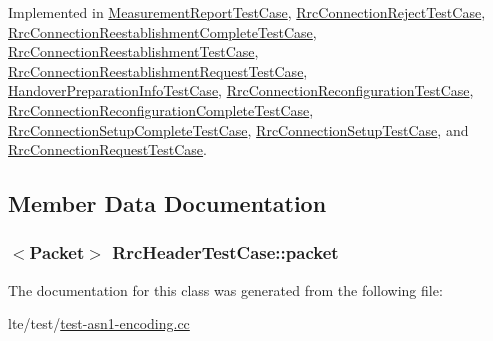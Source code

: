 Implemented in \hyperlink{classMeasurementReportTestCase_adcfdbf787e4820120911329dd17b34df}{Measurement\+Report\+Test\+Case}, \hyperlink{classRrcConnectionRejectTestCase_a0bd7895700a0244130e97d13ae63de94}{Rrc\+Connection\+Reject\+Test\+Case}, \hyperlink{classRrcConnectionReestablishmentCompleteTestCase_a7965b51e212680d083695536b2a2a9b0}{Rrc\+Connection\+Reestablishment\+Complete\+Test\+Case}, \hyperlink{classRrcConnectionReestablishmentTestCase_a83b77e685792d906456e37b202274265}{Rrc\+Connection\+Reestablishment\+Test\+Case}, \hyperlink{classRrcConnectionReestablishmentRequestTestCase_abfefd24ae58ad815de9efe81f4cffeee}{Rrc\+Connection\+Reestablishment\+Request\+Test\+Case}, \hyperlink{classHandoverPreparationInfoTestCase_af2543e8eacd157b1cc0ec5615a3aba95}{Handover\+Preparation\+Info\+Test\+Case}, \hyperlink{classRrcConnectionReconfigurationTestCase_a2b89d71bea1fac367654a314ffb228a8}{Rrc\+Connection\+Reconfiguration\+Test\+Case}, \hyperlink{classRrcConnectionReconfigurationCompleteTestCase_a811358e619874b2e388db76d924a0574}{Rrc\+Connection\+Reconfiguration\+Complete\+Test\+Case}, \hyperlink{classRrcConnectionSetupCompleteTestCase_a0bec6b3fe9ff042780ccbc5f94160412}{Rrc\+Connection\+Setup\+Complete\+Test\+Case}, \hyperlink{classRrcConnectionSetupTestCase_a167082ea179ee6608f4cd608eef3b87e}{Rrc\+Connection\+Setup\+Test\+Case}, and \hyperlink{classRrcConnectionRequestTestCase_a56ad8fb3abe70c33b6dd15b0bb52a71d}{Rrc\+Connection\+Request\+Test\+Case}.



\subsection{Member Data Documentation}
\subsubsection[{\texorpdfstring{packet}{packet}}]{$<${\bf Packet}$>$ Rrc\+Header\+Test\+Case\+::packet\hspace{0.3cm}{\ttfamily [protected]}}\hypertarget{classRrcHeaderTestCase_a6f0748c0e845f797497fbda1ca781803}{}\label{classRrcHeaderTestCase_a6f0748c0e845f797497fbda1ca781803}


The documentation for this class was generated from the following file\+:\begin{DoxyCompactItemize}
\item 
lte/test/\hyperlink{test-asn1-encoding_8cc}{test-\/asn1-\/encoding.\+cc}\end{DoxyCompactItemize}
